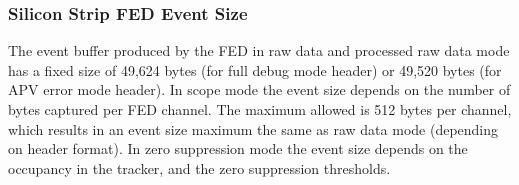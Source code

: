 \subsubsection {Silicon Strip FED Event Size}


The event buffer produced by the FED in raw data and processed raw data mode has a fixed size of 49,624 bytes 
(for full debug mode header) or 49,520 bytes (for APV error mode header). In scope mode the event size depends
on the number of bytes captured per FED channel. The maximum allowed is 512 bytes per channel, which results in
an event size maximum the same as raw data mode (depending on header format). In zero suppression mode the 
event size depends on the occupancy in the tracker, and the zero suppression thresholds.


